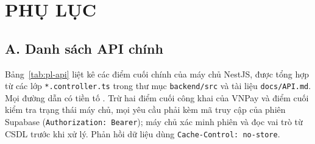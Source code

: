 \chapter*{PHỤ LỤC}
{}

\setcounter{table}{0}
\renewcommand{\thetable}{PL.\arabic{table}}
\renewcommand{\theHtable}{PL.\arabic{table}}

\section*{A. Danh sách API chính}
{}

Bảng~\ref{tab:pl-api} liệt kê các điểm cuối chính của máy chủ NestJS, được tổng hợp từ các lớp \texttt{*.\allowbreak{}controller.\allowbreak{}ts} trong thư mục \texttt{backend/\allowbreak{}src} và tài liệu \texttt{docs/\allowbreak{}API.\allowbreak{}md}. Mọi đường dẫn có tiền tố . Trừ hai điểm cuối công khai của VNPay và điểm cuối kiểm tra trạng thái máy chủ, mọi yêu cầu phải kèm mã truy cập của phiên Supabase (\texttt{Authorization: Bearer}); máy chủ xác minh phiên và đọc vai trò từ CSDL trước khi xử lý. Phản hồi dữ liệu dùng \texttt{Cache-\allowbreak{}Control: no-\allowbreak{}store}.


